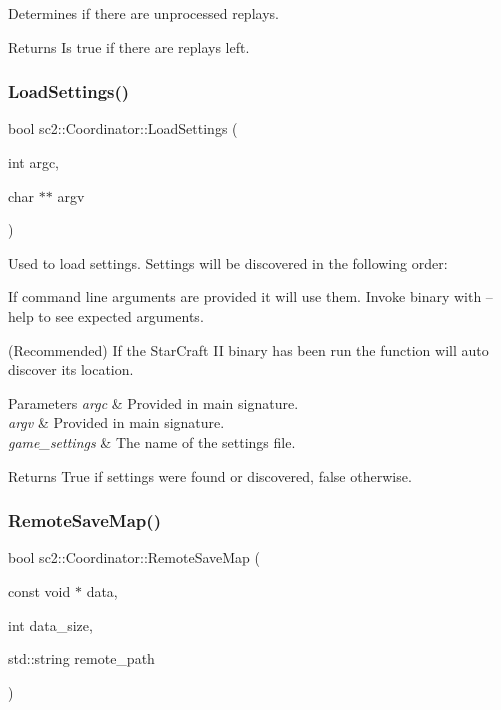 Determines if there are unprocessed replays. \begin{DoxyReturn}{Returns}
Is true if there are replays left. 
\end{DoxyReturn}
\mbox{\label{classsc2_1_1_coordinator_ada059b9a60d901be047ef33ce612c5d2}} 
\subsubsection{\texorpdfstring{Load\+Settings()}{LoadSettings()}}
{\footnotesize\ttfamily bool sc2\+::\+Coordinator\+::\+Load\+Settings (\begin{DoxyParamCaption}\item[{int}]{argc,  }\item[{char $\ast$$\ast$}]{argv }\end{DoxyParamCaption})}

Used to load settings. Settings will be discovered in the following order\+:
\begin{DoxyEnumerate}
\item If command line arguments are provided it will use them. Invoke binary with --help to see expected arguments.
\item (Recommended) If the Star\+Craft II binary has been run the function will auto discover its location. 
\begin{DoxyParams}{Parameters}
{\em argc} & Provided in main signature. \\
\hline
{\em argv} & Provided in main signature. \\
\hline
{\em game\+\_\+settings} & The name of the settings file. \\
\hline
\end{DoxyParams}
\begin{DoxyReturn}{Returns}
True if settings were found or discovered, false otherwise. 
\end{DoxyReturn}

\end{DoxyEnumerate}\mbox{\label{classsc2_1_1_coordinator_abddb83c4a267e3592932da7d198a97d5}} 
\subsubsection{\texorpdfstring{Remote\+Save\+Map()}{RemoteSaveMap()}}
{\footnotesize\ttfamily bool sc2\+::\+Coordinator\+::\+Remote\+Save\+Map (\begin{DoxyParamCaption}\item[{const void $\ast$}]{data,  }\item[{int}]{data\+\_\+size,  }\item[{std\+::string}]{remote\+\_\+path }\end{DoxyParamCaption})}



